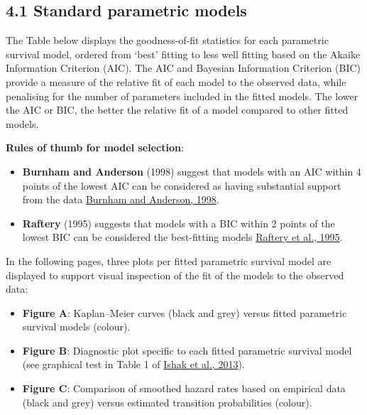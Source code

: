 \documentclass[
]{article}
\providecommand{\tightlist}{%
  \setlength{\itemsep}{0pt}\setlength{\parskip}{0pt}}
\begin{document}
\subsection{4.1 Standard parametric
models}\label{standard-parametric-models}

The Table below displays the goodness-of-fit statistics for each
parametric survival model, ordered from `best' fitting to less well
fitting based on the Akaike Information Criterion (AIC). The AIC and
Bayesian Information Criterion (BIC) provide a measure of the relative
fit of each model to the observed data, while penalising for the number
of parameters included in the fitted models. The lower the AIC or BIC,
the better the relative fit of a model compared to other fitted models.

\textbf{Rules of thumb for model selection}:

\begin{itemize}
\tightlist
\item
  \textbf{Burnham and Anderson} (1998) suggest that models with an AIC
  within 4 points of the lowest AIC can be considered as having
  substantial support from the data
  \href{https://doi.org/10.1007/978-1-4757-2917-7}{Burnham and Anderson,
  1998}.\\
\item
  \textbf{Raftery} (1995) suggests that models with a BIC within 2
  points of the lowest BIC can be considered the best-fitting models
  \href{https://doi.org/10.2307/271063}{Raftery et al., 1995}.
\end{itemize}

In the following pages, three plots per fitted parametric survival model
are displayed to support visual inspection of the fit of the models to
the observed data:

\begin{itemize}
\tightlist
\item
  \textbf{Figure A}: Kaplan--Meier curves (black and grey) versus fitted
  parametric survival models (colour).\\
\item
  \textbf{Figure B}: Diagnostic plot specific to each fitted parametric
  survival model (see graphical test in Table 1 of
  \href{https://doi.org/10.1007/s40273-013-0064-3}{Ishak et al., 2013}).
\item
  \textbf{Figure C}: Comparison of smoothed hazard rates based on
  empirical data (black and grey) versus estimated transition
  probabilities (colour).
\end{itemize}
\end{document}
